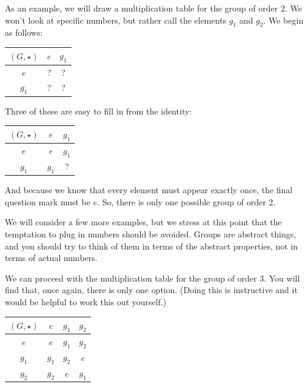 \documentclass[12pt,epsf]{article}
\begin{document}
As an example, we will draw a multiplication table for the group of
order 2.  We won't look at specific numbers, but rather call the
elements $g_1$ and $g_2$.  We begin as follows:
\newline
\begin{table}[h]
\centering
\begin{tabular}{|c||c|c|}
\hline
$(G,\star)$ & $e$ & $g_1$ \\
\hline
\hline
$e$ & ? & ? \\
\hline
$g_1$ & ? & ? \\
\hline
\end{tabular}
\end{table}
\newline
Three of these are easy to fill in from the identity:
\newline
\begin{table}[h]
\centering
\begin{tabular}{|c||c|c|} 
\hline
$(G,\star)$ & $e$ & $g_1$ \\
\hline
\hline
$e$ & $e$ & $g_1$ \\
\hline
$g_1$ & $g_1$ & ? \\
\hline
\end{tabular}\label{order2}
\end{table}
\newline
And because we know that every element must appear exactly once, the
final question mark must be $e$.  So, there is only one possible group
of order 2.  

We will consider a few more examples, but we stress at this point that
the temptation to plug in numbers should be avoided.  Groups are
abstract things, and you should try to think of them in terms of the
abstract properties, not in terms of actual numbers.  

We can proceed with the multiplication table for the group of order 3. 
You will find that, once again, there is only one option. (Doing this is
instructive and it would be helpful to work this out yourself.)
\newline
\begin{table}[h]
\centering
\begin{tabular}{|c||c|c|c|}
\hline
$(G,\star)$ & $e$ & $g_1$ & $g_2$ \\
\hline
\hline
$e$ & $e$ & $g_1$ & $g_2$ \\
\hline
$g_1$ & $g_1$ & $g_2$ & $e$ \\
\hline
$g_2$ & $g_2$ & $e$ & $g_1$ \\
\hline
\end{tabular}
\end{table}
\newline
\end{document}
